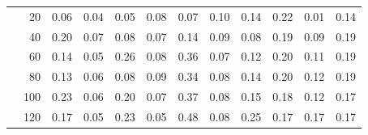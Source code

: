 \begin{tabular}{@{}lrrrrrrrrrrr@{}}
 & 20 & 0.06 & 0.04 & 0.05 & 0.08 & 0.07 & 0.10 & 0.14 & 0.22 & 0.01 & 0.14 \\
 & 40 & 0.20 & 0.07 & 0.08 & 0.07 & 0.14 & 0.09 & 0.08 & 0.19 & 0.09 & 0.19 \\
 & 60 & 0.14 & 0.05 & 0.26 & 0.08 & 0.36 & 0.07 & 0.12 & 0.20 & 0.11 & 0.19 \\
 & 80 & 0.13 & 0.06 & 0.08 & 0.09 & 0.34 & 0.08 & 0.14 & 0.20 & 0.12 & 0.19 \\
 & 100 & 0.23 & 0.06 & 0.20 & 0.07 & 0.37 & 0.08 & 0.15 & 0.18 & 0.12 & 0.17 \\
 & 120 & 0.17 & 0.05 & 0.23 & 0.05 & 0.48 & 0.08 & 0.25 & 0.17 & 0.17 & 0.17 \\
\bottomrule
\end{tabular}
